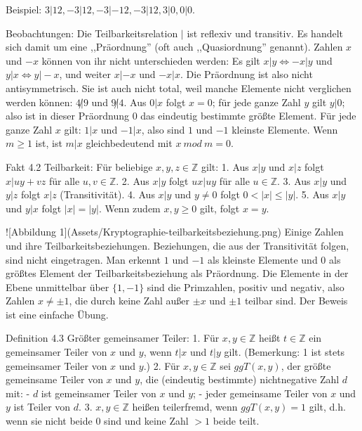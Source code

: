 \documentclass[a4paper]{article}
\begin{document}
\begin{multicols}{3}
        Beispiel: $3|12,-3|12,-3|-12,-3|12,3|0,0|0$.

        Beobachtungen: Die Teilbarkeitsrelation $|$ ist reflexiv und transitiv. Es handelt sich damit um eine ,,Präordnung'' (oft auch ,,Quasiordnung'' genannt). Zahlen $x$ und $-x$ können von ihr nicht unterschieden werden: Es gilt $x|y\Leftrightarrow -x|y$ und $y|x\Leftrightarrow y|-x$, und weiter $x|-x$ und $-x|x$. Die Präordnung ist also nicht antisymmetrisch. Sie ist auch nicht total, weil manche Elemente nicht verglichen werden können: $4\not|9$ und $9\not|4$. Aus $0|x$ folgt $x=0$; für jede ganze Zahl $y$ gilt $y|0$; also ist in dieser Präordnung $0$ das eindeutig bestimmte größte Element. Für jede ganze Zahl $x$ gilt: $1|x$ und $-1|x$, also sind $1$ und $-1$ kleinste Elemente. Wenn $m\geq 1$ ist, ist $m|x$ gleichbedeutend mit $x\ mod\ m= 0$.

        Fakt 4.2 Teilbarkeit: Für beliebige $x,y,z\in\mathbb{Z}$ gilt:
        1. Aus $x|y$ und $x|z$ folgt $x|uy+vz$ für alle $u,v\in\mathbb{Z}$.
        2. Aus $x|y$ folgt $ux|uy$ für alle $u\in\mathbb{Z}$.
        3. Aus $x|y$ und $y|z$ folgt $x|z$ (Transitivität).
        4. Aus $x|y$ und $y\not= 0$ folgt $0<|x|\leq |y|$.
        5. Aus $x|y$ und $y|x$ folgt $|x|=|y|$. Wenn zudem $x,y\geq 0$ gilt, folgt $x=y$.

        ![Abbildung 1](Assets/Kryptographie-teilbarkeitsbeziehung.png)
        Einige Zahlen und ihre Teilbarkeitsbeziehungen. Beziehungen, die aus der Transitivität folgen, sind nicht eingetragen. Man erkennt $1$ und $-1$ als kleinste Elemente und $0$ als größtes Element der Teilbarkeitsbeziehung als Präordnung. Die Elemente in der Ebene unmittelbar über $\{1,-1\}$ sind die Primzahlen, positiv und negativ, also Zahlen $x\not=\pm 1$, die durch keine Zahl außer $\pm x$ und $\pm 1$ teilbar sind.
        Der Beweis ist eine einfache Übung.

        Definition 4.3 Größter gemeinsamer Teiler:
        1. Für $x,y\in\mathbb{Z}$ heißt $t\in\mathbb{Z}$ ein gemeinsamer Teiler von $x$ und $y$, wenn $t|x$ und $t|y$ gilt. (Bemerkung: 1 ist stets gemeinsamer Teiler von $x$ und $y$.)
        2. Für $x,y\in\mathbb{Z}$ sei $ggT(x, y)$, der größte gemeinsame Teiler von $x$ und $y$, die (eindeutig bestimmte) nichtnegative Zahl $d$ mit:
        - $d$ ist gemeinsamer Teiler von $x$ und $y$;
        - jeder gemeinsame Teiler von $x$ und $y$ ist Teiler von $d$.
        3. $x,y\in\mathbb{Z}$ heißen teilerfremd, wenn $ggT(x,y)=1$ gilt, d.h. wenn sie nicht beide $0$ sind und keine Zahl $>1$ beide teilt.


\end{multicols}
\end{document}
